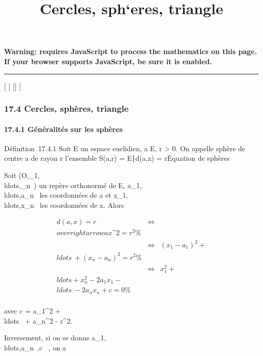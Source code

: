 \documentclass[]{article}
\title{Cercles, sph`eres, triangle}
\author{}
\date{}
\begin{document}
\maketitle

\textbf{Warning: 
requires JavaScript to process the mathematics on this page.\\ If your
browser supports JavaScript, be sure it is enabled.}

\begin{center}\rule{3in}{0.4pt}\end{center}

{[}
{[}
{[}{]}
{[}

\subsubsection{17.4 Cercles, sphères, triangle}

\paragraph{17.4.1 Généralités sur les sphères}

Définition~17.4.1 Soit E un espace euclidien, a \in E, r \textgreater{} 0.
On appelle sphère de centre a de rayon r l'ensemble S(a,r) =
\x \in E∣d(a,x) =
r\.

Equation de sphères

Soit
(O,\vece_1,\\ldots,\vece_n~)
un repère orthonormé de E,
a_1,\\ldots,a_n~
les coordonnées de a et
x_1,\\ldots,x_n~
les coordonnées de x. Alors

\begin{align*} d(a,x) = r&
\Leftrightarrow &
\\overrightarrowax\^2
= r^2 \%& \\ &
\Leftrightarrow & (x_1 -
a_1)^2 +
\\ldots~ +
(x_ n - a_n)^2 = r^2 \%&
\\ & \Leftrightarrow &
x_1^2 +
\\ldots + x_
n^2 - 2a_ 1x_1
-\\ldots~ -
2a_nx_n + c = 0\%& \\
\end{align*}

avec c = a_1^2 +
\\ldots~ +
a_n^2 - r^2.

Inversement, si on se donne
a_1,\\ldots,a_n~,c
\in {}~, on a
\end{document}
